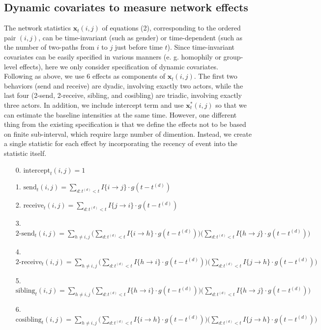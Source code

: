 \documentclass[a4paper]{article}
\begin{document}
\subsection{Dynamic covariates to measure network effects}
The network statistics $\boldsymbol{x}_t(i, j)$ of equations (2), corresponding to the ordered pair $(i, j)$, can be time-invariant (such as gender) or time-dependent (such as the number of two-paths from $i$ to $j$ just before time $t$). Since time-invariant covariates can be easily specified in various manners (e. g. homophily or group-level effects), here we only consider specification of dynamic covariates.\\\newline
Following \cite{PerryWolfe2012} as above, we use 6 effects as components of $\boldsymbol{x}_t(i, j)$. The first two behaviors (send and receive) are dyadic, involving exactly two actors,
while the last four (2-send, 2-receive, sibling, and cosibling) are triadic, involving exactly three actors. In addition, we include intercept term and use $\boldsymbol{x}^*_t(i, j)$ so that we can estimate the baseline intensities at the same time. However, one different thing from the existing specification is that we define the effects not to be based on finite sub-interval, which require large number of dimention. Instead, we create a single statistic for each effect by incorporating the recency of event into the statistic itself. 
\begin{itemize}[leftmargin=*,rightmargin=-1cm ]
\item [0.] $\mbox{intercept}_t(i, j) = 1$
\item [1.]  $\mbox{send}_t(i, j)=\sum\limits_{d: t^{(d)}<t} I\{i\rightarrow j\}\cdot g(t-t^{(d)})$
\item [2.] $\mbox{receive}_t(i, j)=\sum\limits_{d: t^{(d)}<t} I\{j\rightarrow i\}\cdot g(t-t^{(d)})$
\item [3.] $\mbox{2-send}_t(i, j)=\sum\limits_{h \neq i, j}\Big(\sum\limits_{d: t^{(d)}<t}  I\{i\rightarrow h\}\cdot g(t-t^{(d)})\Big)\Big(\sum\limits_{d: t^{(d)}<t} I\{h\rightarrow j\}\cdot g(t-t^{(d)})\Big)$
\item [4.]  $\mbox{2-receive}_t(i, j)=\sum\limits_{h \neq i, j}\Big(\sum\limits_{d: t^{(d)}<t} I\{h\rightarrow i\}\cdot g(t-t^{(d)})\Big)\Big(\sum\limits_{d: t^{(d)}<t} I\{j\rightarrow h\}\cdot g(t-t^{(d)})\Big)$
\item [5.] $\mbox{sibling}_t(i, j)=\sum\limits_{h \neq i, j}\Big(\sum\limits_{d: t^{(d)}<t} I\{h\rightarrow i\}\cdot g(t-t^{(d)})\Big)\Big(\sum\limits_{d: t^{(d)}<t} I\{h\rightarrow j\}\cdot g(t-t^{(d)})\Big)$
\item [6.] $\mbox{cosibling}_t(i, j)=\sum\limits_{h \neq i, j}\Big(\sum\limits_{d: t^{(d)}<t} I\{i\rightarrow h\}\cdot g(t-t^{(d)})\Big)\Big(\sum\limits_{d: t^{(d)}<t} I\{j\rightarrow h\}\cdot g(t-t^{(d)})\Big)$
\end{itemize}
\end{document}
